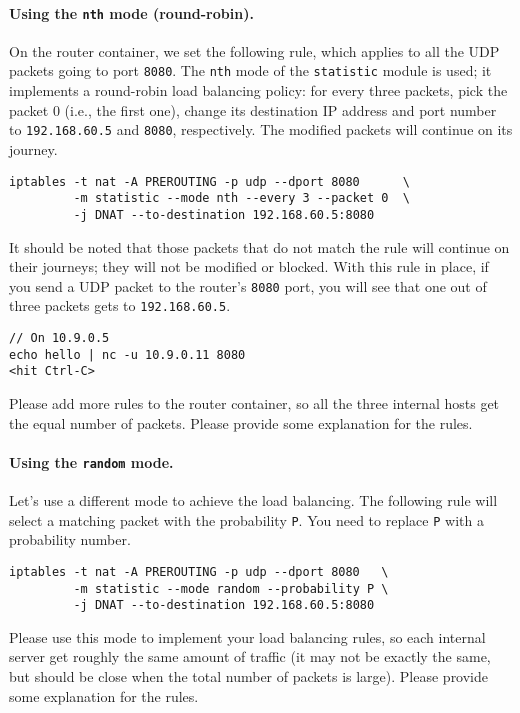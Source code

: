 \paragraph{Using the \texttt{nth} mode (round-robin).}
On the router container, we set the following rule, which applies 
to all the UDP packets going to port \texttt{8080}. 
The \texttt{nth} mode of the \texttt{statistic} module is used; 
it implements a round-robin load balancing policy: for every
three packets, pick the packet 0 (i.e., the first one), 
change its destination IP address and port number to 
\texttt{192.168.60.5}  and \texttt{8080}, respectively.  
The modified packets will continue on its journey.

\begin{lstlisting}
iptables -t nat -A PREROUTING -p udp --dport 8080      \
         -m statistic --mode nth --every 3 --packet 0  \
         -j DNAT --to-destination 192.168.60.5:8080
\end{lstlisting}

It should be noted that those packets that do not match
the rule will continue on their journeys; they will
not be modified or blocked. With this rule in place, 
if you send a UDP packet to the router's \texttt{8080} port,  
you will see that one out of three packets gets to 
\texttt{192.168.60.5}. 

\begin{lstlisting}
// On 10.9.0.5
echo hello | nc -u 10.9.0.11 8080
<hit Ctrl-C>
\end{lstlisting}
 

Please add more rules to the router container, 
so all the three internal hosts get the equal 
number of packets. 
Please provide some explanation for the rules. 


\paragraph{Using the \texttt{random} mode.}
Let's use a different mode to achieve the load balancing. The following 
rule will select a matching packet with the probability \texttt{P}.  
You need to replace \texttt{P} with a probability number.

\begin{lstlisting}
iptables -t nat -A PREROUTING -p udp --dport 8080   \
         -m statistic --mode random --probability P \
         -j DNAT --to-destination 192.168.60.5:8080
\end{lstlisting}

Please use this mode to implement your load balancing 
rules, so each internal server get roughly the 
same amount of traffic (it may not be exactly the same, 
but should be close when the total number of packets is large). 
Please provide some explanation for the rules. 


